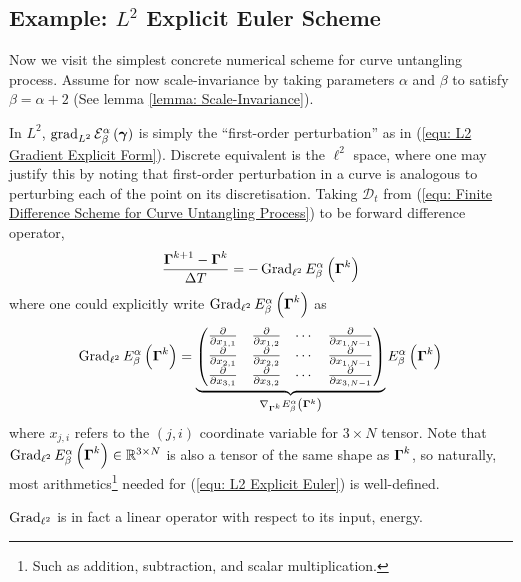 \documentclass[../dissertation.tex]{subfiles}
\begin{document}
\subsection{Example: $L^2$ Explicit Euler Scheme}
Now we visit the simplest concrete numerical scheme for curve untangling process.
Assume for now scale-invariance by taking parameters $\alpha$ and $\beta$ to satisfy $\beta = \alpha+2$ (See lemma \ref{lemma: Scale-Invariance}).

In $L^2$, $\operatorname{grad}_{L^2} \mathcal{E}_{\beta}^{\alpha} \left( \boldsymbol{\gamma} \right)$ is simply the ``first-order perturbation'' as in (\ref{equ: L2 Gradient Explicit Form}).
Discrete equivalent is the $\ell^2$ space,
where one may justify this by noting that first-order perturbation in a curve is analogous to perturbing each of the point on its discretisation.
Taking $\mathcal{D}_t$ from (\ref{equ: Finite Difference Scheme for Curve Untangling Process}) to be forward difference operator,
\begin{equation}
    \frac{\boldsymbol{\Gamma}^{k+1} - \boldsymbol{\Gamma}^k}{\Delta T} = - \operatorname{Grad}_{\ell^2} E_{\beta}^{\alpha} \left( \boldsymbol{\Gamma}^k \right)
    \label{equ: L2 Explicit Euler}
\end{equation}
where one could explicitly write $\operatorname{Grad}_{\ell^2} E_{\beta}^\alpha \left( \boldsymbol{\Gamma}^k \right)$ as
\begin{equation}
    \operatorname{Grad}_{\ell^2} E_{\beta}^\alpha \left( \boldsymbol{\Gamma}^k \right)
    =
    \underbrace{
        \begin{pmatrix}
            \frac{\partial}{\partial x_{1,1}} & \frac{\partial}{\partial x_{1,2}} & \cdots & \frac{\partial}{\partial x_{1,N-1}} \\
            \frac{\partial}{\partial x_{2,1}} & \frac{\partial}{\partial x_{2,2}} & \cdots & \frac{\partial}{\partial x_{1,N-1}} \\
            \frac{\partial}{\partial x_{3,1}} & \frac{\partial}{\partial x_{3,2}} & \cdots & \frac{\partial}{\partial x_{3,N-1}}
        \end{pmatrix}
    }_{\nabla_{\boldsymbol{\Gamma}^k} E_{\beta}^\alpha \left( \boldsymbol{\Gamma}^k \right)}
    E_{\beta}^{\alpha} \left( \boldsymbol{\Gamma}^k \right)
    \label{equ: Gradient in l2}
\end{equation}
where $x_{j,i}$ refers to the $\left( j,i \right)$ coordinate variable for $3 \times N$ tensor.
Note that $\operatorname{Grad}_{\ell^2} E_{\beta}^\alpha \left( \boldsymbol{\Gamma}^k \right) \in \mathbb{R}^{3 \times N}$ is also a tensor of the same shape as $\boldsymbol{\Gamma}^k$,
so naturally, most arithmetics\footnote{Such as addition, subtraction, and scalar multiplication.} needed for (\ref{equ: L2 Explicit Euler}) is well-defined.
\begin{remark}
    $\operatorname{Grad}_{\ell^2}$ is in fact a linear operator with respect to its input, energy.
\end{remark}
\end{document}
